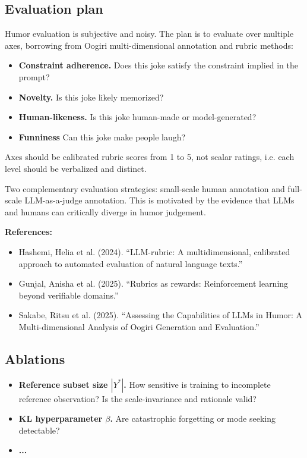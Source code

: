 \documentclass[12pt]{extarticle}
\begin{document}
\subsection{Evaluation plan}
Humor evaluation is subjective and noisy. The plan is to evaluate over multiple axes, borrowing from Oogiri multi-dimensional annotation and rubric methods:
\begin{itemize}[leftmargin=1.5em]
  \item \textbf{Constraint adherence.} Does this joke satisfy the constraint implied in the prompt?
  \item \textbf{Novelty.} Is this joke likely memorized?
  \item \textbf{Human-likeness.} Is this joke human-made or model-generated?
  \item \textbf{Funniness} Can this joke make people laugh?
\end{itemize}

Axes should be calibrated rubric scores from 1 to 5, not scalar ratings, i.e. each level should be verbalized and distinct.

Two complementary evaluation strategies: small-scale human annotation and full-scale LLM-as-a-judge annotation. This is motivated by the evidence that LLMs and humans can critically diverge in humor judgement.

\textbf{References:}
\begin{itemize}[leftmargin=1.5em]
  \item Hashemi, Helia et al. (2024). ``LLM-rubric: A multidimensional, calibrated approach to automated evaluation of natural language texts.''
  \item Gunjal, Anisha et al. (2025). ``Rubrics as rewards: Reinforcement learning beyond verifiable domains.''
  \item Sakabe, Ritsu et al. (2025). ``Assessing the Capabilities of LLMs in Humor: A Multi-dimensional Analysis of Oogiri Generation and Evaluation.''
\end{itemize}

\subsection{Ablations}
\begin{itemize}[leftmargin=1.5em]
  \item \textbf{Reference subset size \(|Y^*|\).} How sensitive is training to incomplete reference observation? Is the scale-invariance and  rationale valid?
  \item \textbf{KL hyperparameter \(\beta\).} Are catastrophic forgetting or mode seeking detectable?
  \item  \textbf{...}
\end{itemize}
\end{document}
